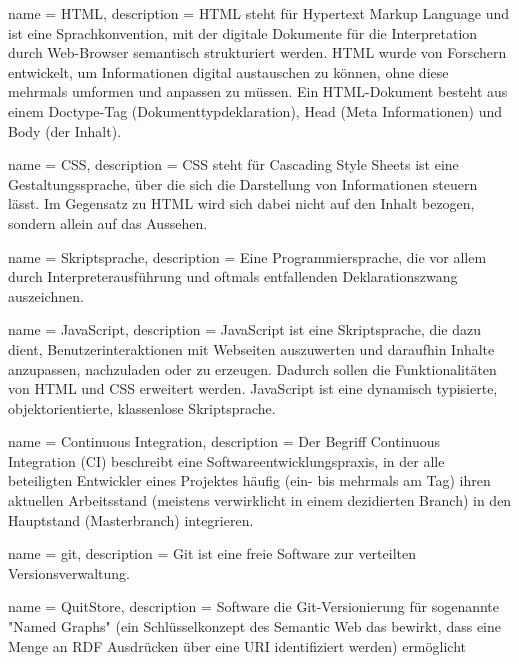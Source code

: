      {
        name = HTML,
        description = {
            HTML steht für Hypertext Markup Language und ist eine Sprachkonvention, mit 
            der digitale Dokumente für die Interpretation durch Web-Browser semantisch 
            strukturiert werden. HTML wurde von Forschern entwickelt, um Informationen 
            digital austauschen zu können, ohne diese mehrmals umformen und anpassen zu 
            müssen. Ein HTML-Dokument besteht aus einem Doctype-Tag 
            (Dokumenttypdeklaration), Head 
            (Meta Informationen) und Body (der Inhalt).
        }
    }


     {
        name = CSS,
        description = {
            CSS steht für Cascading Style Sheets ist eine Gestaltungssprache, über die 
            sich die Darstellung von Informationen steuern lässt. Im Gegensatz zu HTML 
            wird sich dabei nicht auf den Inhalt bezogen, sondern allein auf das Aussehen.
        }
    }


     {
        name = Skriptsprache,
        description = {
            Eine Programmiersprache, die vor allem durch Interpreterausführung und oftmals 
            entfallenden Deklarationszwang auszeichnen.
        }
    }



     {
        name = JavaScript,
        description = {
            JavaScript ist eine Skriptsprache, die dazu dient, Benutzerinteraktionen mit 
            Webseiten auszuwerten und daraufhin Inhalte anzupassen, nachzuladen oder zu 
            erzeugen. Dadurch sollen die Funktionalitäten von HTML und CSS erweitert 
            werden. JavaScript ist eine dynamisch typisierte, objektorientierte, 
            klassenlose Skriptsprache.
        }
    }


    {
       name = Continuous Integration,
       description = {
           Der Begriff Continuous Integration (CI) beschreibt eine Softwareentwicklungspraxis,
           in der alle beteiligten Entwickler eines Projektes häufig (ein- bis mehrmals am
           Tag) ihren aktuellen Arbeitsstand (meistens verwirklicht in einem dezidierten
           Branch) in den Hauptstand (Masterbranch)
           integrieren. 
       }
   }

     {
        name = git,
        description = {
            Git ist eine freie Software zur verteilten Versionsverwaltung.
        }
    }
    
     {
        name = QuitStore, 
        description = {
            Software die Git-Versionierung für sogenannte "Named Graphs" (ein Schlüsselkonzept 
            des Semantic Web das bewirkt, dass eine Menge an RDF Ausdrücken über eine URI 
            identifiziert werden) ermöglicht
        }
    }

